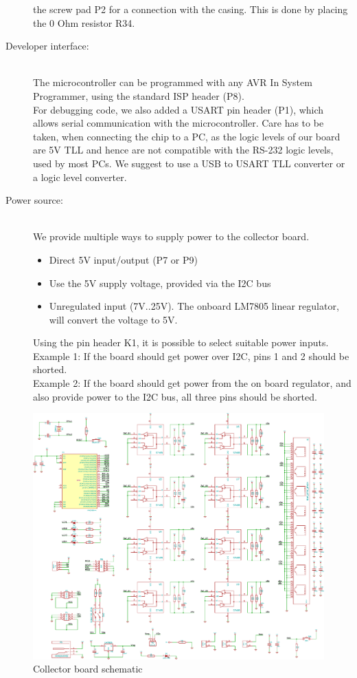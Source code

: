 \documentclass[a4paper]{scrreprt}
\begin{document}
\begin{description}
    the screw pad P2 for a connection with the casing. This is done by
    placing the 0 Ohm resistor R34.
  \item[Developer interface:]\hspace{1cm}\\
    The microcontroller can be programmed with any AVR In System
    Programmer, using the standard ISP header (P8).\\
    For debugging code, we also added a USART pin header (P1), which
    allows serial communication with the microcontroller. Care
    has to be taken, when connecting the chip to a PC, as the logic
    levels of our board are 5V TLL and hence are not compatible
    with the RS-232 logic levels, used by most PCs. We suggest to use
    a USB to USART TLL converter or a logic level converter.
  \item[Power source:]\hspace{1cm}\\
    We provide multiple ways to supply power to the collector board.
    \begin{itemize}
      \item Direct 5V input/output (P7 or P9)
      \item Use the 5V supply voltage, provided via the I2C bus
      \item Unregulated input (7V..25V). The onboard LM7805 linear
        regulator, will convert the voltage to 5V.
    \end{itemize}
    Using the pin header K1, it is possible to select suitable
    power inputs.\\
    Example 1: If the board should get power over I2C, pins 1 and 2
    should be shorted.\\
    Example 2: If the board should get power from the on board
    regulator, and also provide power to the I2C bus, all three pins
    should be shorted.
\end{description}
\begin{figure}
	\centering
	\includegraphics[width=1\textwidth]{img/schem_collector_board.pdf}
	\caption{Collector board schematic}
	\label{fig:schem_collect}
\end{figure}
\end{document}
